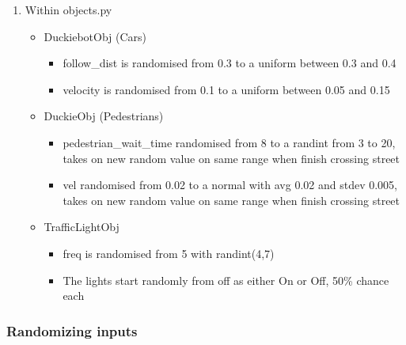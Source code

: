\documentclass[12pt]{article}
\begin{document}
\begin{enumerate}
    \item Within objects.py
    \begin{itemize}
        \item DuckiebotObj (Cars)
        \begin{itemize}
            \item follow\_dist is randomised from 0.3 to a uniform between 0.3 and 0.4
            \item velocity is randomised from 0.1 to a uniform between 0.05 and 0.15
        \end{itemize}
        \item DuckieObj (Pedestrians)
        \begin{itemize}
            \item pedestrian\_wait\_time randomised from 8 to a randint from 3 to 20, takes on new random value on same range when finish crossing street
            \item vel randomised from 0.02 to a normal with avg 0.02 and stdev 0.005, takes on new random value on same range when finish crossing street
        \end{itemize}
        \item TrafficLightObj
        \begin{itemize}
            \item freq is randomised from 5 with randint(4,7)
            \item The lights start randomly from off as either On or Off, 50\% chance each
        \end{itemize}
    \end{itemize}
\end{enumerate}


\subsubsection{Randomizing inputs}
\end{document}
